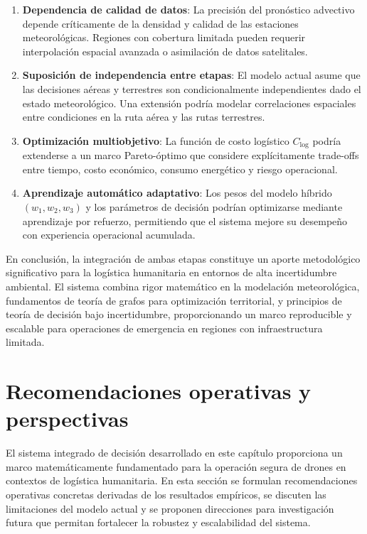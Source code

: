 \documentclass[
  spanish,
  us-letterpaper,
]{scrreprt}
\numberwithin{equation}{section}
\begin{document}
\begin{enumerate}
\def\labelenumi{\arabic{enumi}.}
\item
  \textbf{Dependencia de calidad de datos}: La precisión del pronóstico
  advectivo depende críticamente de la densidad y calidad de las
  estaciones meteorológicas. Regiones con cobertura limitada pueden
  requerir interpolación espacial avanzada o asimilación de datos
  satelitales.
\item
  \textbf{Suposición de independencia entre etapas}: El modelo actual
  asume que las decisiones aéreas y terrestres son condicionalmente
  independientes dado el estado meteorológico. Una extensión podría
  modelar correlaciones espaciales entre condiciones en la ruta aérea y
  las rutas terrestres.
\item
  \textbf{Optimización multiobjetivo}: La función de costo logístico
  \(C_{\text{log}}\) podría extenderse a un marco Pareto-óptimo que
  considere explícitamente trade-offs entre tiempo, costo económico,
  consumo energético y riesgo operacional.
\item
  \textbf{Aprendizaje automático adaptativo}: Los pesos del modelo
  híbrido \((w_1, w_2, w_3)\) y los parámetros de decisión podrían
  optimizarse mediante aprendizaje por refuerzo, permitiendo que el
  sistema mejore su desempeño con experiencia operacional acumulada.
\end{enumerate}

En conclusión, la integración de ambas etapas constituye un aporte
metodológico significativo para la logística humanitaria en entornos de
alta incertidumbre ambiental. El sistema combina rigor matemático en la
modelación meteorológica, fundamentos de teoría de grafos para
optimización territorial, y principios de teoría de decisión bajo
incertidumbre, proporcionando un marco reproducible y escalable para
operaciones de emergencia en regiones con infraestructura limitada.

\section{Recomendaciones operativas y
perspectivas}\label{recomendaciones-operativas-y-perspectivas}

El sistema integrado de decisión desarrollado en este capítulo
proporciona un marco matemáticamente fundamentado para la operación
segura de drones en contextos de logística humanitaria. En esta sección
se formulan recomendaciones operativas concretas derivadas de los
resultados empíricos, se discuten las limitaciones del modelo actual y
se proponen direcciones para investigación futura que permitan
fortalecer la robustez y escalabilidad del sistema.
\end{document}
